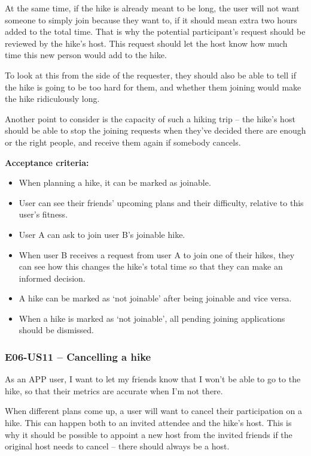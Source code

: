 At the same time, if the hike is already meant to be long, the user will not want someone to simply join because they want to, if it should mean extra two hours added to the total time.
That is why the potential participant's request should be reviewed by the hike's host.
This request should let the host know how much time this new person would add to the hike.

To look at this from the side of the requester, they should also be able to tell if the hike is going to be too hard for them, and whether them joining would make the hike ridiculously long.

Another point to consider is the capacity of such a hiking trip -- the hike's host should be able to stop the joining requests when they've decided there are enough or the right people, and receive them again if somebody cancels.

\textbf{Acceptance criteria:}
\begin{itemize}
    \item When planning a hike, it can be marked as joinable.
    \item User can see their friends' upcoming plans and their difficulty, relative to this user's fitness.
    \item User A can ask to join user B's joinable hike.
    \item When user B receives a request from user A to join one of their hikes, they can see how this changes the hike's total time so that they can make an informed decision.
    \item A hike can be marked as `not joinable' after being joinable and vice versa.
    \item When a hike is marked as `not joinable', all pending joining applications should be dismissed.
\end{itemize}

\subsubsection*{E06-US11 -- Cancelling a hike}
As an APP user, I want to let my friends know that I won't be able to go to the hike, so that their metrics are accurate when I'm not there.

When different plans come up, a user will want to cancel their participation on a hike.
This can happen both to an invited attendee and the hike's host.
This is why it should be possible to appoint a new host from the invited friends if the original host needs to cancel -- there should always be a host.

